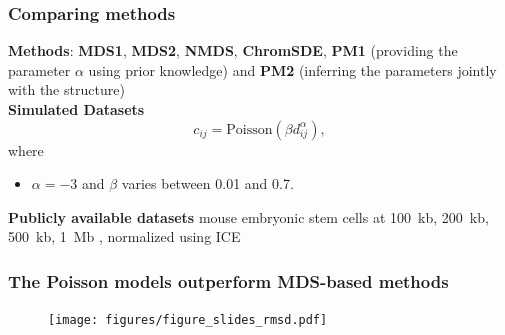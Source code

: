 \documentclass[xcolor=dvipsnames]{beamer}
\begin{document}

\begin{frame}
\frametitle{Comparing methods}

{\color{Blue} \textbf{Methods}}: \textbf{MDS1}, \textbf{MDS2}, \textbf{NMDS},
\textbf{ChromSDE},
\textbf{PM1} (providing the parameter $\alpha$ using prior knowledge)
and \textbf{PM2} (inferring the parameters jointly with the structure) \\

\vspace{1em}
{\color{Blue} \textbf{Simulated Datasets}}
\begin{equation*}\label{eq:simu}
c_{ij} = \text{Poisson}(\beta d_{ij}^\alpha),
\end{equation*}
where 
\begin{itemize}[label={$\bullet$}]

\item $\alpha = -3$ and $\beta$ varies between 0.01 and 0.7.

\end{itemize}

\vspace{1em}
{\color{Blue} \textbf{Publicly available datasets}} mouse embryonic stem cells at
100~kb, 200~kb, 500~kb, 1~Mb {\scriptsize \citep{dixon:topological}},
normalized using ICE {\scriptsize
\citep{imakaev:iterative}}

\end{frame}




\begin{frame}
\frametitle{The Poisson models outperform MDS-based methods}
\begin{figure}
\texttt{[image: figures/figure\_slides\_rmsd.pdf]}
\end{figure}
\end{frame}
\end{document}

